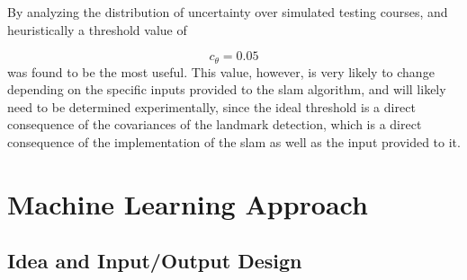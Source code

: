 By analyzing the distribution of uncertainty over simulated testing courses, and heuristically a threshold value of

$$c_\theta = 0.05$$
was found to be the most useful. This value, however, is very likely to change depending on the specific inputs provided to the \ac{slam} algorithm, and will likely need to be determined experimentally, since the ideal threshold is a direct consequence of the covariances of the landmark detection, which is a direct consequence of the implementation of the \ac{slam} as well as the input provided to it.


\section{Machine Learning Approach}
\subsection{Idea and Input/Output Design}
